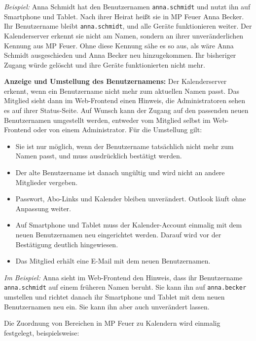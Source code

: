 \documentclass[a4paper,fontsize=10pt]{scrartcl}
\begin{document}
\emph{Beispiel:} Anna Schmidt hat den Benutzernamen \texttt{anna.schmidt} und
nutzt ihn auf Smartphone und Tablet. Nach ihrer Heirat heißt sie in MP Feuer
Anna Becker. Ihr Benutzername bleibt \texttt{anna.schmidt}, und alle Geräte
funktionieren weiter. Der Kalenderserver erkennt sie nicht am Namen, sondern
an ihrer unveränderlichen Kennung aus MP Feuer. Ohne diese Kennung sähe es
so aus, als wäre Anna Schmidt ausgeschieden und Anna Becker neu
hinzugekommen. Ihr bisheriger Zugang würde gelöscht und ihre Geräte
funktionierten nicht mehr.

\textbf{Anzeige und Umstellung des Benutzernamens:} Der Kalenderserver
erkennt, wenn ein Benutzername nicht mehr zum aktuellen Namen passt. Das
Mitglied sieht dann im Web-Frontend einen Hinweis, die Administratoren sehen
es auf ihrer Status-Seite. Auf Wunsch kann der Zugang auf den passenden neuen
Benutzernamen umgestellt werden, entweder vom Mitglied selbst im
Web-Frontend oder von einem Administrator. Für die Umstellung gilt:

\begin{itemize}
  \item Sie ist nur möglich, wenn der Benutzername tatsächlich nicht mehr
        zum Namen passt, und muss ausdrücklich bestätigt werden.
  \item Der alte Benutzername ist danach ungültig und wird nicht an andere
        Mitglieder vergeben.
  \item Passwort, Abo-Links und Kalender bleiben unverändert. Outlook läuft
        ohne Anpassung weiter.
  \item Auf Smartphone und Tablet muss der Kalender-Account einmalig mit dem
        neuen Benutzernamen neu eingerichtet werden. Darauf wird vor der
        Bestätigung deutlich hingewiesen.
  \item Das Mitglied erhält eine E-Mail mit dem neuen Benutzernamen.
\end{itemize}

\emph{Im Beispiel:} Anna sieht im Web-Frontend den Hinweis, dass ihr
Benutzername \texttt{anna.schmidt} auf einem früheren Namen beruht. Sie kann
ihn auf \texttt{anna.becker} umstellen und richtet danach ihr Smartphone und
Tablet mit dem neuen Benutzernamen neu ein. Sie kann ihn aber auch
unverändert lassen.

Die Zuordnung von Bereichen in MP Feuer zu Kalendern wird einmalig
festgelegt, beispielsweise:
\end{document}
